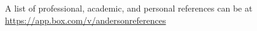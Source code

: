 \begin{center}
A list of professional, academic, and personal references can be at \href{https://app.box.com/v/andersonreferences}{https://app.box.com/v/andersonreferences}
\end{center}
